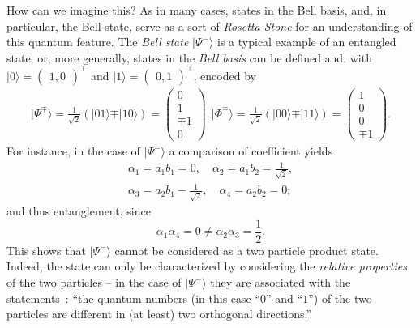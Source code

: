 \label{bellstate1}
How can we imagine this?
As in many cases, states in the Bell basis, and, in particular, the Bell state,
serve as a sort of
{\em Rosetta Stone}
for an understanding of this quantum feature.
The {\em Bell state}
$\vert \Psi^- \rangle$ is a typical example of an entangled state;
or, more generally, states in the
{\em Bell basis}
 can be defined and,
with
$\vert  0 \rangle =  \begin{pmatrix}1,0\end{pmatrix}^\intercal$
and
$\vert  1 \rangle =  \begin{pmatrix}0,1\end{pmatrix}^\intercal$,
  encoded by
\begin{equation}
\begin{split}
\vert \Psi^\mp \rangle = \frac{1}{\sqrt{2}}\left(\vert 0   1 \rangle \mp \vert 1   0 \rangle  \right)= \begin{pmatrix}0\\ 1\\ \mp 1\\ 0\end{pmatrix},
\vert \Phi^\mp \rangle = \frac{1}{\sqrt{2}}\left(\vert 0   0 \rangle \mp \vert 1   1 \rangle  \right)= \begin{pmatrix}1\\ 0\\ 0\\ \mp 1\end{pmatrix} .
\end{split}
\label{2014-m-ch-fdvs-bellbasis2}
\end{equation}
For instance, in the case of $\vert \Psi^- \rangle$ a comparison of coefficient yields
\begin{equation}
\begin{split}
\alpha_1=a_1b_1=0, \quad
\alpha_2=a_1b_2=\frac{1}{\sqrt{2}},\\
\alpha_3=a_2b_1-\frac{1}{\sqrt{2}}, \quad
\alpha_4=a_2b_2=0;
\end{split}
\label{2012-m-ch-fdvs-BellSCC}
\end{equation}
and thus
entanglement, since
\begin{equation}
{\alpha_1}{\alpha_4}=0 \neq {\alpha_2}{\alpha_3}=\frac{1}{2}.
\end{equation}
This shows that  $\vert \Psi^- \rangle$ cannot be considered as a two particle product state.
Indeed, the state can only be characterized by considering the {\em relative properties}
of the two particles --
in the case of  $\vert \Psi^- \rangle$ they are associated with the statements~\cite{zeil-99}:
``the quantum numbers (in this case ``$0$'' and ``$1$'') of the two particles are different in (at least) two orthogonal directions.''


